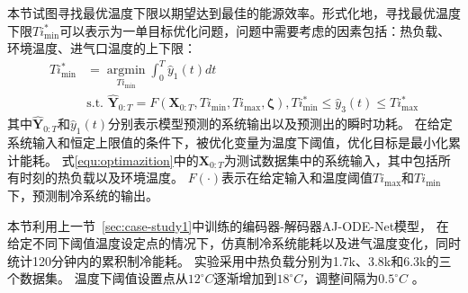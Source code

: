 本节试图寻找最优温度下限以期望达到最佳的能源效率。形式化地，寻找最优温度下限$Ti_{\min}^{*}$可以表示为一单目标优化问题，问题中需要考虑的因素包括：热负载、环境温度、进气口温度的上下限：
\begin{equation}
    \begin{aligned}
       Ti^*_{\min}&=\mathop{\arg\min}\limits_{Ti_{\min}} \int_{0}^{T} \hat{y}_{1}(t) dt \\
       &\text{s.t. } \hat{\boldsymbol{Y}}_{0: T}=F\left(\boldsymbol{X}_{0: T},Ti_{\min}, Ti_{\max},\boldsymbol{\zeta}\right),
       Ti^*_{\min}\leq \hat{y}_{3}(t) \leq Ti^*_{\max}
    \end{aligned}
    \label{equ:optimazition}
    \end{equation}
其中$\hat{\boldsymbol{Y}}_{0: T}$和$\hat{y}_{1}(t)$分别表示模型预测的系统输出以及预测出的瞬时功耗。
在给定系统输入和恒定上限值的条件下，被优化变量为温度下阈值，优化目标是最小化累计能耗。
式\eqref{equ:optimazition}中的$\boldsymbol{X}_{0: T}$为测试数据集中的系统输入，其中包括所有时刻的热负载以及环境温度。
$F(\cdot)$表示在给定输入和温度阈值$Ti_{\max}$和$Ti_{\min}$下，预测制冷系统的输出。

本节利用上一节~\ref{sec:case-study1}中训练的编码器-解码器AJ-ODE-Net模型，
在给定不同下阈值温度设定点的情况下，仿真制冷系统能耗以及进气温度变化，同时统计120分钟内的累积制冷能耗。
实验采用中热负载分别为1.7k、3.8k和6.3k的三个数据集。
温度下阈值设置点从$12^{\circ}C$逐渐增加到$18^{\circ}C$，调整间隔为$0.5^{\circ}C$ 。

